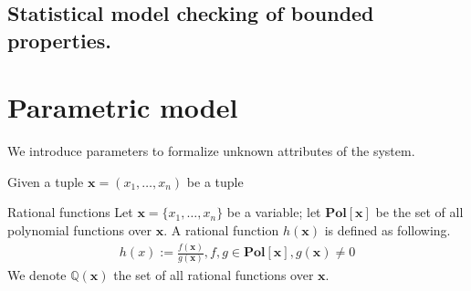 \subsection{Statistical model checking of bounded properties.}

\section{Parametric model}
We introduce parameters to formalize unknown attributes of the system.
\begin{definition}
    Given a tuple $\mathbf{x}=(x_1,\ldots,x_n)$ be a tuple
\end{definition}

\begin{definition}{Rational functions}
    Let $\mathbf{x}=\{x_1,\ldots,x_n\}$ be a variable; let $\mathbf{Pol}[\mathbf{x}]$ be the set of
    all polynomial functions over $\mathbf{x}$. A rational function $h(\mathbf{x})$ is defined
    as following.
    \begin{align*}
        h(x) := \frac{f(\mathbf{x})}{g(\mathbf{x})}, f,g\in\mathbf{Pol}[\mathbf{x}], g(\mathbf{x}) \neq 0
    \end{align*}
    We denote $\mathbb{Q}(\mathbf{x})$ the set of all rational functions over $\mathbf{x}$.
\end{definition}


